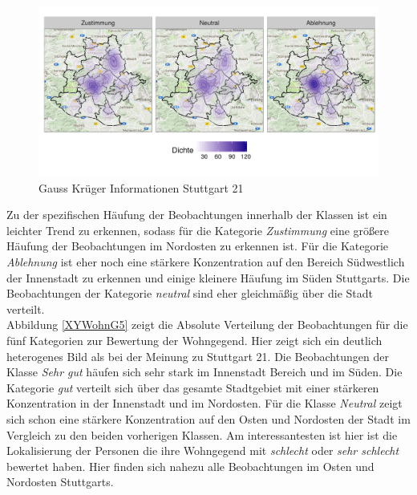 \documentclass{Vorlage}
\begin{document}
\begin{figure}[h]
 \begin{center}
 \includegraphics[scale=0.8]{Pictures/XYStuttgart3.png}
 \caption{Gauss Krüger Informationen Stuttgart 21}
 \label{XYStuttgart3}
 \end{center}
\end{figure}

Zu der spezifischen Häufung der Beobachtungen innerhalb der Klassen ist ein leichter Trend zu erkennen, sodass für die Kategorie \textit{Zustimmung} eine größere Häufung der Beobachtungen im Nordosten zu erkennen ist. Für die Kategorie \textit{Ablehnung} ist eher noch eine stärkere Konzentration auf den Bereich Südwestlich der Innenstadt zu erkennen und einige kleinere Häufung im Süden Stuttgarts. Die Beobachtungen der Kategorie \textit{neutral} sind eher gleichmäßig über die Stadt verteilt.\\
Abbildung \ref{XYWohnG5} zeigt die Absolute Verteilung der Beobachtungen für die fünf Kategorien zur Bewertung der Wohngegend. Hier zeigt sich ein deutlich heterogenes Bild als bei der Meinung zu Stuttgart 21. Die Beobachtungen der Klasse \textit{Sehr gut} häufen sich sehr stark im Innenstadt Bereich und im Süden. Die Kategorie \textit{gut} verteilt sich über das gesamte Stadtgebiet mit einer stärkeren Konzentration in der Innenstadt und im Nordosten. Für die Klasse \textit{Neutral} zeigt sich schon eine stärkere Konzentration auf den Osten und Nordosten der Stadt im Vergleich zu den beiden vorherigen Klassen. Am interessantesten ist hier ist die Lokalisierung der Personen die ihre Wohngegend mit \textit{schlecht} oder \textit{sehr schlecht} bewertet haben. Hier finden sich nahezu alle Beobachtungen im Osten und Nordosten Stuttgarts.
\end{document}
